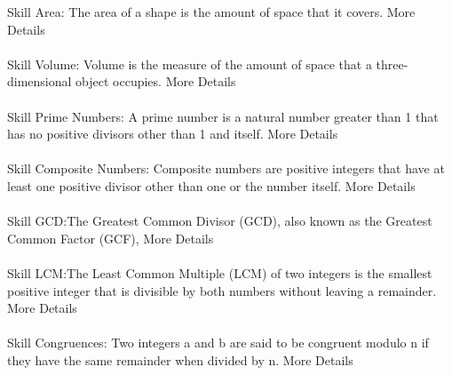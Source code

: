 \documentclass{article} \usepackage{arxiv}
\begin{document}
\begin{tcolorbox}[title = {Skills for MATH}, colback = Apricot!25!white, colframe = BrickRed!75!black,fontupper =\fontsize{7.5pt}{6pt}\selectfont]
Skill Area:  The area of a shape is the amount of space that it covers. More Details\\ \\

Skill Volume:   Volume is the measure of the amount of space that a three-dimensional object occupies. More Details\\ \\

Skill Prime Numbers: A prime number is a natural number greater than 1 that has no positive divisors other than 1 and itself. More Details\\ \\

Skill Composite Numbers: Composite numbers are positive integers that have at least one positive divisor other than one or the number itself. More Details\\ \\

Skill GCD:The Greatest Common Divisor (GCD), also known as the Greatest Common Factor (GCF),  More Details\\ \\

Skill LCM:The Least Common Multiple (LCM) of two integers is the smallest positive integer that is divisible by both numbers without leaving a remainder. More Details\\ \\

Skill Congruences: Two integers a and b are said to be congruent modulo n if they have the same remainder when divided by n. More Details \\
\end{tcolorbox}
\noindent\begin{minipage}{\textwidth} 
 \label{Tab:math_skill}
\end{minipage}


\newpage
\end{document}
